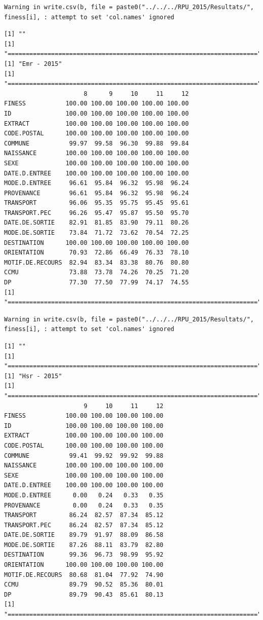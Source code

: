 \documentclass[]{article}
\begin{document}
\begin{verbatim}
Warning in write.csv(b, file = paste0("../../../RPU_2015/Resultats/",
finess[i], : attempt to set 'col.names' ignored
\end{verbatim}

\begin{verbatim}
[1] ""
[1] "====================================================================="
[1] "Emr - 2015"
[1] "====================================================================="
                      8      9     10     11     12
FINESS           100.00 100.00 100.00 100.00 100.00
ID               100.00 100.00 100.00 100.00 100.00
EXTRACT          100.00 100.00 100.00 100.00 100.00
CODE.POSTAL      100.00 100.00 100.00 100.00 100.00
COMMUNE           99.97  99.58  96.30  99.88  99.84
NAISSANCE        100.00 100.00 100.00 100.00 100.00
SEXE             100.00 100.00 100.00 100.00 100.00
DATE.D.ENTREE    100.00 100.00 100.00 100.00 100.00
MODE.D.ENTREE     96.61  95.84  96.32  95.98  96.24
PROVENANCE        96.61  95.84  96.32  95.98  96.24
TRANSPORT         96.06  95.35  95.75  95.45  95.61
TRANSPORT.PEC     96.26  95.47  95.87  95.50  95.70
DATE.DE.SORTIE    82.91  81.85  83.90  79.11  80.26
MODE.DE.SORTIE    73.84  71.72  73.62  70.54  72.25
DESTINATION      100.00 100.00 100.00 100.00 100.00
ORIENTATION       70.93  72.86  66.49  76.33  78.10
MOTIF.DE.RECOURS  82.94  83.34  83.38  80.76  80.80
CCMU              73.88  73.78  74.26  70.25  71.20
DP                77.30  77.50  77.99  74.17  74.55
[1] "====================================================================="
\end{verbatim}

\begin{verbatim}
Warning in write.csv(b, file = paste0("../../../RPU_2015/Resultats/",
finess[i], : attempt to set 'col.names' ignored
\end{verbatim}

\begin{verbatim}
[1] ""
[1] "====================================================================="
[1] "Hsr - 2015"
[1] "====================================================================="
                      9     10     11     12
FINESS           100.00 100.00 100.00 100.00
ID               100.00 100.00 100.00 100.00
EXTRACT          100.00 100.00 100.00 100.00
CODE.POSTAL      100.00 100.00 100.00 100.00
COMMUNE           99.41  99.92  99.92  99.88
NAISSANCE        100.00 100.00 100.00 100.00
SEXE             100.00 100.00 100.00 100.00
DATE.D.ENTREE    100.00 100.00 100.00 100.00
MODE.D.ENTREE      0.00   0.24   0.33   0.35
PROVENANCE         0.00   0.24   0.33   0.35
TRANSPORT         86.24  82.57  87.34  85.12
TRANSPORT.PEC     86.24  82.57  87.34  85.12
DATE.DE.SORTIE    89.79  91.97  88.09  86.58
MODE.DE.SORTIE    87.26  88.11  83.79  82.80
DESTINATION       99.36  96.73  98.99  95.92
ORIENTATION      100.00 100.00 100.00 100.00
MOTIF.DE.RECOURS  80.68  81.04  77.92  74.90
CCMU              89.79  90.52  85.36  80.01
DP                89.79  90.43  85.61  80.13
[1] "====================================================================="
\end{verbatim}
\end{document}
